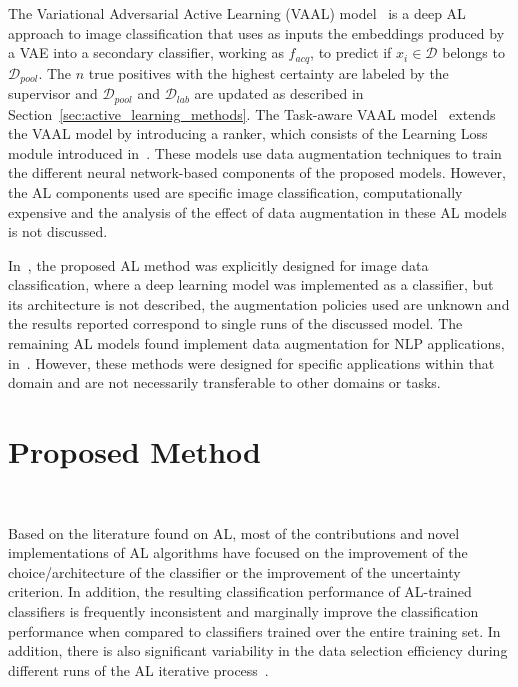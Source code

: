 \documentclass[parskip=full]{scrartcl}
\begin{document}
The Variational Adversarial Active Learning (VAAL)
model~\cite{sinha2019variational} is a deep AL approach to image
classification that uses as inputs the embeddings produced by a VAE into a
secondary classifier, working as $f_{acq}$, to predict if $x_i \in
\mathcal{D}$ belongs to $\mathcal{D}_{pool}$. The $n$ true positives with the
highest certainty are labeled by the supervisor and $\mathcal{D}_{pool}$ and
$\mathcal{D}_{lab}$ are updated as described in
Section~\ref{sec:active_learning_methods}. The Task-aware VAAL
model~\cite{kim2021task} extends the VAAL model by introducing a ranker, which
consists of the Learning Loss module introduced in~\cite{Yoo2019}. These
models use data augmentation techniques to train the different neural
network-based components of the proposed models. However, the AL components
used are specific image classification, computationally expensive and the
analysis of the effect of data augmentation in these AL models is not
discussed.

In~\cite{Ma2020}, the proposed AL method was explicitly designed for image
data classification, where a deep learning model was implemented as a
classifier, but its architecture is not described, the augmentation policies
used are unknown and the results reported correspond to single runs of the
discussed model. The remaining AL models found implement data augmentation for
NLP applications, in~\cite{Quteineh2020, Li2021framework}. However, these
methods were designed for specific applications within that domain and are not
necessarily transferable to other domains or tasks.

\section{Proposed Method}~\label{sec:proposed_method}

Based on the literature found on AL, most of the contributions and novel
implementations of AL algorithms have focused on the improvement of the
choice/architecture of the classifier or the improvement of the uncertainty
criterion. In addition, the resulting classification performance of AL-trained
classifiers is frequently inconsistent and marginally improve the
classification performance when compared to classifiers trained over the
entire training set. In addition, there is also significant variability in the
data selection efficiency during different runs of the AL iterative
process~\cite{Fonseca2021}.
 
\end{document}

